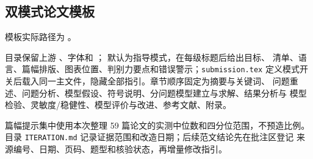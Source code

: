 \subsection{双模式论文模板}

模板实际路径为 。\par
目录保留上游
、字体和
； 默认为指导模式，在每级标题后给出目标、
清单、语言、篇幅排版、图表位置、判别力要点和错误警示；\texttt{submission.tex}
定义模式开关后载入同一主文件，隐藏全部指引。章节顺序固定为摘要与关键词、
问题重述、问题分析、模型假设、符号说明、分问题模型建立与求解、结果分析与
模型检验、灵敏度/稳健性、模型评价与改进、参考文献、附录。

篇幅提示集中使用本次整理 59 篇论文的实测中位数和四分位范围，不预造比例。目录
\texttt{ITERATION.md} 记录证据范围和改造日期；后续范文结论先在批注区登记
来源编号、日期、页码、题型和核验状态，再增量修改指引。


